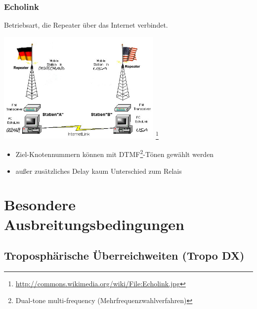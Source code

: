 \begin{frame}
    \frametitle{Echolink}

    Betriebsart, die Repeater über das Internet verbindet.

    \begin{center}
        \includegraphics[width=0.6\textwidth,height=.5\textheight,keepaspectratio]{bv11/Echolink.jpg}
        \footnote{\tiny \url{http://commons.wikimedia.org/wiki/File:Echolink.jpg}}
    \end{center}

    \begin{itemize}
        \item Ziel-Knotennummern können mit DTMF\footnote{Dual-tone multi-frequency
              (Mehrfrequenzwahlverfahren)}-Tönen gewählt werden
        \item außer zusätzliches Delay kaum Unterschied zum Relais
    \end{itemize}

\end{frame}

\section[Ausbreitungsbed.]{Besondere Ausbreitungsbedingungen}

\subsection[Tropo DX]{Troposphärische Überreichweiten (Tropo DX)}

